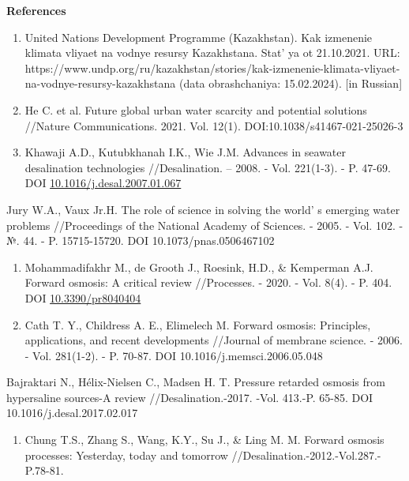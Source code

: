 \begin{center}
{\bfseries References}
\end{center}

\begin{references}
\begin{enumerate}
\def\labelenumi{\arabic{enumi}.}
\item
  United Nations Development Programme (Kazakhstan). Kak izmenenie
  klimata vliyaet na vodnye resursy Kazakhstana. Stat' ya
  ot 21.10.2021. URL:
  https://www.undp.org/ru/kazakhstan/stories/kak-izmenenie-klimata-vliyaet-na-vodnye-resursy-kazakhstana
  (data obrashchaniya: 15.02.2024). {[}in Russian{]}
\item
  He C. et al. Future global urban water scarcity and potential
  solutions //Nature Communications. 2021. Vol. 12(1).
  DOI:10.1038/s41467-021-25026-3
\item
  Khawaji A.D., Kutubkhanah I.K., Wie J.M. Advances in seawater
  desalination technologies //Desalination. -- 2008. - Vol. 221(1-3). -
  P. 47-69. DOI
  \href{http://dx.doi.org/10.1016/j.desal.2007.01.067}{10.1016/j.desal.2007.01.067}
\end{enumerate}

Jury W.A., Vaux Jr.H. The role of science in solving the
world' s emerging water problems //Proceedings of the
National Academy of Sciences. - 2005. - Vol. 102. - №. 44. - P.
15715-15720. DOI 10.1073/pnas.0506467102

\begin{enumerate}
\def\labelenumi{\arabic{enumi}.}
\setcounter{enumi}{3}
\item
  Mohammadifakhr M., de Grooth J., Roesink, H.D., \& Kemperman A.J.
  Forward osmosis: A critical review //Processes. - 2020. - Vol. 8(4). -
  P. 404. DOI
  \href{http://dx.doi.org/10.3390/pr8040404}{10.3390/pr8040404}
\item
  Cath T. Y., Childress A. E., Elimelech M. Forward osmosis: Principles,
  applications, and recent developments //Journal of membrane science. -
  2006. - Vol. 281(1-2). - P. 70-87. DOI 10.1016/j.memsci.2006.05.048
\end{enumerate}

Bajraktari N., Hélix-Nielsen C., Madsen H. T. Pressure retarded osmosis
from hypersaline sources-A review //Desalination.-2017. -Vol. 413.-P.
65-85. DOI 10.1016/j.desal.2017.02.017

\begin{enumerate}
\def\labelenumi{\arabic{enumi}.}
\setcounter{enumi}{5}
\item
  Chung T.S., Zhang S., Wang, K.Y., Su J., \& Ling M. M. Forward osmosis
  processes: Yesterday, today and tomorrow
  //Desalination.-2012.-Vol.287.- P.78-81.
\end{enumerate}


\end{references}
